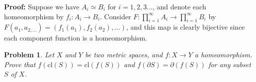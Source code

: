 \documentclass[12pt]{article}
\newtheorem{problem}{Problem}
\begin{document}
\textbf{Proof:} Suppose we have $A_{i}\simeq B_{i}$ for $i=1, 2, 3\dots$, and denote each homeomorphism by $f_{i}: A_{i}\to B_{i}$. Consider $F: \prod\limits_{i=1}^{\infty}A_{i}\to \prod\limits_{i=1}^{\infty}B_{i}$ by $F(a_{1}, a_{2, \dots})=(f_{1}(a_{1}), f_{2}(a_{2}),\dots)$, and this map is clearly bijective since each component function is a homeomorphism.
\\
\begin{problem}
Let $X$ and $Y$ be two metric spaces, and $f: X\to Y$ a homeomorphism. Prove that $f(\text{cl}(S))=\text{cl}(f(S))$ and $f(\partial S)=\partial(f(S))$ for any subset $S$ of $X$.
\end{problem}
\end{document}

